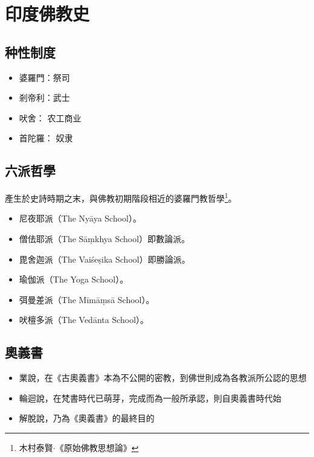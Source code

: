 \section{印度佛教史}

\subsection{种性制度}
\begin{itemize}
  \item 婆羅門：祭司
  \item 剎帝利：武士
  \item 吠舍： 农工商业
  \item 首陀羅： 奴隶
\end{itemize}

\subsection{六派哲學}
產生於史詩時期之末，與佛教初期階段相近的婆羅門教哲學\footnote{木村泰賢$\cdot$《原始佛教思想論》}。
\begin{itemize}
  \item 尼夜耶派（The Nyāya School）。
  \item 僧佉耶派（The Sāṃkhya School）即數論派。
  \item 毘舍迦派（The Vaiśeṣika School）即勝論派。
  \item 瑜伽派（The Yoga School）。
  \item 弭曼差派（The Mīmāṃsā School）。
  \item 吠檀多派（The Vedānta School）。
\end{itemize}

\subsection{奧義書}
\begin{itemize}
  \item 業說，在《古奧義書》本為不公開的密教，到佛世則成為各教派所公認的思想
  \item 輪迴說，在梵書時代已萌芽，完成而為一般所承認，則自奧義書時代始
  \item 解脫說，乃為《奧義書》的最終目的
\end{itemize}

